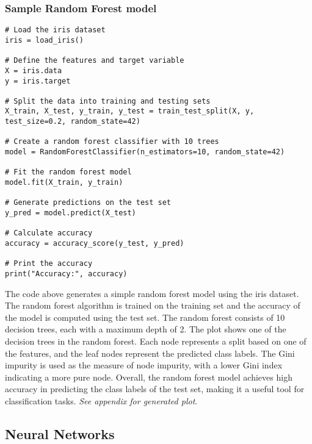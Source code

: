 \documentclass{article}[12pt]
\theoremstyle{definition}
\begin{document}
\newpage

\bigskip

\subsubsection{Sample Random Forest model}

\begin{verbatim}
# Load the iris dataset
iris = load_iris()

# Define the features and target variable
X = iris.data
y = iris.target

# Split the data into training and testing sets
X_train, X_test, y_train, y_test = train_test_split(X, y, 
test_size=0.2, random_state=42)

# Create a random forest classifier with 10 trees
model = RandomForestClassifier(n_estimators=10, random_state=42)

# Fit the random forest model
model.fit(X_train, y_train)

# Generate predictions on the test set
y_pred = model.predict(X_test)

# Calculate accuracy
accuracy = accuracy_score(y_test, y_pred)

# Print the accuracy
print("Accuracy:", accuracy)
\end{verbatim}

\bigskip

\noindent
The code above generates a simple random forest model using the iris dataset. The random forest algorithm is trained on the training set and the accuracy of the model is computed using the test set. The random forest consists of 10 decision trees, each with a maximum depth of 2. The plot shows one of the decision trees in the random forest. Each node represents a split based on one of the features, and the leaf nodes represent the predicted class labels. The Gini impurity is used as the measure of node impurity, with a lower Gini index indicating a more pure node. Overall, the random forest model achieves high accuracy in predicting the class labels of the test set, making it a useful tool for classification tasks. \textit{See appendix for generated plot}.

\newpage

\bigskip

\subsection{Neural Networks}

\bigskip
\end{document}
